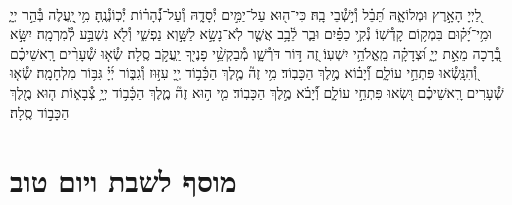 \documentclass[twoside, openany, parskip=half, 11pt]{book}
\begin{document}
\begin{sometimes}

\\
%
לַ֭יְיָ הָאָ֣רֶץ וּמְלוֹאָ֑הּ תֵּ֝בֵ֗ל וְ֯י֣שְׁ֯בֵי בָֽהּ׃
כִּי־ה֖וּא עַל־יַמִּ֣ים יְ֯סָדָ֑הּ וְ֯עַל־נְ֝֯הָר֗וֹת יְ֯כֽוֹנְ֯נֶֽהָ׃
מִ֥י ֖יַֽעֲלֶה בְּ֯הַ֣ר יְיָ֑ וּמִ֥י־יָ֝ק֗וּם בִּמְק֥וֹם קָדְ֯שֽׁוֹ׃
נְ֯קִ֥י כַפַּ֗יִם וּבַ֢ר לֵ֫בָ֥ב אֲשֶׁ֤ר לֹֽא־נָשָׂ֣א לַשָּׁ֣וְא נַפְשִׁ֑י וְ֯לֹ֖א נִשְׁבַּ֣ע לְ֯מִרְמָֽה׃
יִשָּׂ֣א בְ֭֯רָכָה מֵאֵ֣ת יְיָ֑ וּ֝צְדָקָ֗ה מֵֽאֱלֹהֵ֥י יִשְׁעֽוֹ׃
זֶ֭ה דּ֣וֹר דֹּרְ֯שָׁ֑ו מְ֯בַקְשֵׁ֥֨י פָנֶי֖ךָ יַֽעֲקֹ֣ב סֶֽלָה׃
שְׂ֯א֤וּ שְׁ֯עָרִ֨ים רָֽאשֵׁיכֶ֗ם וְ֭֯הִנָּֽשְׂ֯אוּ פִּתְחֵ֣י עוֹלָ֑ם וְ֝֯יָב֗וֹא מֶ֣לֶךְ הַכָּבֽוֹד׃
מִ֥י זֶה֘ מֶ֤לֶךְ הַכָּ֫ב֥וֹד יְ֖יָ עִזּ֣וּז וְ֯גִבּ֑וֹר יְ֜יָ֗ גִּבּ֥וֹר מִלְחָמָֽה׃
שְׂ֯א֤וּ שְׁ֯עָרִים רָֽאשֵׁיכֶ֗ם וּ֭שְׂאוּ פִּתְחֵ֣י עוֹלָ֑ם וְ֝֯יָבֹ֗א מֶ֣לֶךְ הַכָּבֽוֹד׃
מִ֤י ה֣וּא זֶה֘ מֶ֢לֶךְ הַכָּ֫ב֥וֹד יְיָ֥ צְ֯בָא֑וֹת ה֤וּא מֶ֖לֶךְ הַכָּב֣וֹד סֶֽלָה׃

\end{sometimes}



\etzchaim

\halfkaddish


\vspace{\baselineskip}

\nextpage

\chapter[מוסף לשבת ויו״ט]{ מוסף לשבת ויום טוב }

\amidaopening{\shabbosshuva}{}
\nextpage

\end{document}
